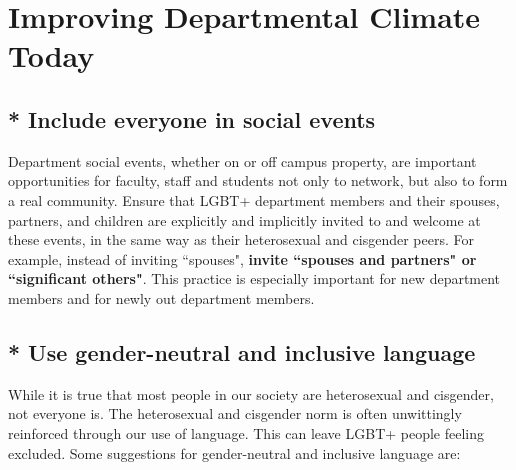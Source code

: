 %

\chapter{Improving Departmental Climate Today}	%
\label{climate-today}		%
\normalsize			%

\section {* Include everyone in social events}
\label{social-events}
Department social events, whether on or off campus property, are important opportunities for faculty, staff and students not only to network, but also to form a real community. Ensure that LGBT+ department members and their spouses, partners, and children are explicitly and implicitly invited to and welcome at these events, in the same way as their heterosexual and cisgender peers. For example, instead of inviting ``spouses", \textbf{invite ``spouses and partners" or ``significant others"}. This practice is especially important for new department members and for newly out department members. 

\section {* Use gender-neutral and inclusive language}
\label{gender-language}
While it is true that most people in our society are heterosexual and cisgender, not everyone is. The heterosexual and cisgender norm is often unwittingly reinforced through our use of language. This can leave LGBT+ people feeling excluded. Some suggestions for gender-neutral and inclusive language are:

